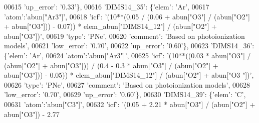 \begin{DoxyCode}
00615                                        \textcolor{stringliteral}{'up\_error'}: \textcolor{stringliteral}{'0.33'}\},
00616                          \textcolor{stringliteral}{'DIMS14\_35'}: \{\textcolor{stringliteral}{'elem'}: \textcolor{stringliteral}{'Ar'},
00617                                        \textcolor{stringliteral}{'atom'}:\textcolor{stringliteral}{'abun["Ar3"]'}, 
00618                                        \textcolor{stringliteral}{'icf'}: \textcolor{stringliteral}{'(10**(0.05 / (0.06 + abun["O3"] / (abun["O2"] + abun["O3"]))
       - 0.07)) * elem\_abun["DIMS14\_12"] / (abun["O2"] + abun["O3"])'},
00619                                        \textcolor{stringliteral}{'type'}: \textcolor{stringliteral}{'PNe'},
00620                                        \textcolor{stringliteral}{'comment'}: \textcolor{stringliteral}{'Based on photoionization models'},
00621                                        \textcolor{stringliteral}{'low\_error'}: \textcolor{stringliteral}{'0.70'},
00622                                        \textcolor{stringliteral}{'up\_error'}: \textcolor{stringliteral}{'0.60'}\},
00623                          \textcolor{stringliteral}{'DIMS14\_36'}: \{\textcolor{stringliteral}{'elem'}: \textcolor{stringliteral}{'Ar'},
00624                                        \textcolor{stringliteral}{'atom'}:\textcolor{stringliteral}{'abun["Ar3"]'}, 
00625                                        \textcolor{stringliteral}{'icf'}: \textcolor{stringliteral}{'(10**((0.03  * abun["O3"] / (abun["O2"] + abun["O3"])) /
       (0.4 - 0.3 * abun["O3"] / (abun["O2"] + abun["O3"])) - 0.05)) * elem\_abun["DIMS14\_12"] / (abun["O2"] + abun["O3
      "])'},
00626                                        \textcolor{stringliteral}{'type'}: \textcolor{stringliteral}{'PNe'},
00627                                        \textcolor{stringliteral}{'comment'}: \textcolor{stringliteral}{'Based on photoionization models'},
00628                                        \textcolor{stringliteral}{'low\_error'}: \textcolor{stringliteral}{'0.70'},
00629                                        \textcolor{stringliteral}{'up\_error'}: \textcolor{stringliteral}{'0.60'}\},
00630                          \textcolor{stringliteral}{'DIMS14\_39'}: \{\textcolor{stringliteral}{'elem'}: \textcolor{stringliteral}{'C'},
00631                                        \textcolor{stringliteral}{'atom'}:\textcolor{stringliteral}{'abun["C3"]'}, 
00632                                        \textcolor{stringliteral}{'icf'}: \textcolor{stringliteral}{'(0.05 + 2.21 * abun["O3"] / (abun["O2"] + abun["O3"]) - 2.77
}
\end{DoxyCode}
